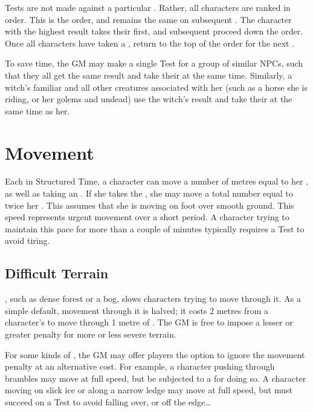 \capital{\initiative} Tests are not made against a particular {\tn}.
Rather, all characters are ranked in order.
This is the {\initiative} order, and remains the same on subsequent {\rounds}.
The character with the highest result takes their {\turn} first, and subsequent {\turns} proceed down the {\initiative} order.
Once all characters have taken a {\turn}, return to the top of the {\initiative} order for the next {\round}.

To save time, the GM may make a single Test for a group of similar NPCs, such that they all get the same result and take their {\turns} at the same time.
Similarly, a witch's familiar and all other creatures associated with her (such as a horse she is riding, or her golems and undead) use the witch's {\initiative} result and take their {\turns} at the same time as her.

\section{Movement}

Each {\turn} in Structured Time, a character can move a number of metres equal to her , as well as taking an {\action}.
If she takes the  {\action}, she may move a total number equal to twice her .
This assumes that she is moving on foot over smooth ground.
This speed represents urgent movement over a short period.
A character trying to maintain this pace for more than a couple of minutes typically requires a  Test to avoid tiring.



\subsection{Difficult Terrain}

\capital{\difficultterrain}, such as dense forest or a bog, slows characters trying to move through it.
As a simple default, movement through it is halved; it costs 2 metres from a character's  to move through 1 metre of {\difficultterrain}.
The GM is free to impose a lesser or greater penalty for more or less severe terrain.

For some kinds of {\difficultterrain}, the GM may offer players the option to ignore the movement penalty at an alternative cost.
For example, a character pushing through brambles may move at full speed, but be subjected to a {\damagetest} for doing so.
A character moving on slick ice or along a narrow ledge may move at full speed, but must succeed on a  Test to avoid falling over, or off the edge{\dots}

